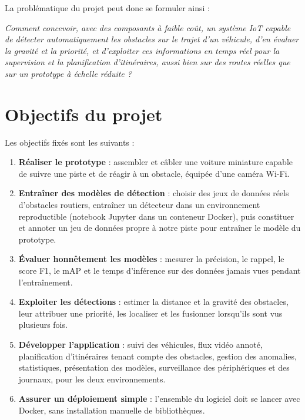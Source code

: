La problématique du projet peut donc se formuler ainsi :
\begin{center}
\begin{minipage}{0.9\linewidth}\itshape
Comment concevoir, avec des composants à faible coût, un système IoT capable de détecter automatiquement les
obstacles sur le trajet d'un véhicule, d'en évaluer la gravité et la priorité, et d'exploiter ces informations
en temps réel pour la supervision et la planification d'itinéraires, aussi bien sur des routes réelles que sur un
prototype à échelle réduite ?
\end{minipage}
\end{center}

\section{Objectifs du projet}

Les objectifs fixés sont les suivants :
\begin{enumerate}
  \item \textbf{Réaliser le prototype} : assembler et câbler une voiture miniature capable de suivre une piste et
        de réagir à un obstacle, équipée d'une caméra Wi-Fi.
  \item \textbf{Entraîner des modèles de détection} : choisir des jeux de données réels d'obstacles routiers,
        entraîner un détecteur dans un environnement reproductible (notebook Jupyter dans un conteneur Docker), puis
        constituer et annoter un jeu de données propre à notre piste pour entraîner le modèle du prototype.
  \item \textbf{Évaluer honnêtement les modèles} : mesurer la précision, le rappel, le score F1, le mAP et le
        temps d'inférence sur des données jamais vues pendant l'entraînement.
  \item \textbf{Exploiter les détections} : estimer la distance et la gravité des obstacles, leur attribuer une
        priorité, les localiser et les fusionner lorsqu'ils sont vus plusieurs fois.
  \item \textbf{Développer l'application \app} : suivi des véhicules, flux vidéo annoté, planification
        d'itinéraires tenant compte des obstacles, gestion des anomalies, statistiques, présentation des modèles,
        surveillance des périphériques et des journaux, pour les deux environnements.
  \item \textbf{Assurer un déploiement simple} : l'ensemble du logiciel doit se lancer avec Docker, sans
        installation manuelle de bibliothèques.
\end{enumerate}

